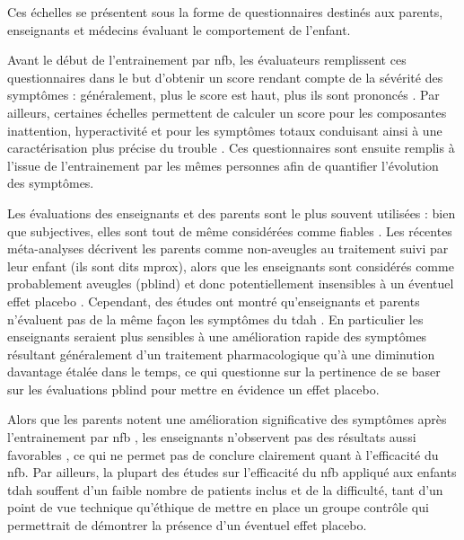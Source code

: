 Ces échelles se présentent sous la forme de questionnaires destinés aux parents, enseignants et médecins évaluant le comportement de l'enfant. 

Avant le début de l'entrainement par \gls{nfb}, les évaluateurs remplissent ces questionnaires dans le but d'obtenir un score rendant compte de 
la sévérité des symptômes : généralement, plus le score est haut, plus ils sont prononcés \citep{Pappas2006, Conners2008}. Par ailleurs, certaines échelles 
permettent de calculer un score pour les composantes inattention, hyperactivité et pour les symptômes totaux conduisant ainsi à une caractérisation 
plus précise du trouble \citep{Pappas2006}. Ces questionnaires sont ensuite remplis à l'issue de l'entrainement par les mêmes personnes afin de quantifier l'évolution 
des symptômes. 

Les évaluations des enseignants et des parents sont le plus souvent utilisées : bien que subjectives, elles sont tout de même considérées comme fiables 
\citep{Mcgough2004, Arns2020}. Les récentes méta-analyses décrivent les parents comme non-aveugles au traitement suivi par leur enfant (ils sont dits \gls{mprox}), alors
que les enseignants sont considérés comme probablement aveugles (\gls{pblind}) et donc potentiellement insensibles à un éventuel effet placebo 
\citep{Micoulaud2014, Cortese2016}. Cependant, des études ont montré qu'enseignants et parents n'évaluent pas de la même façon les symptômes du \gls{tdah}
\citep{Sollie2013, Narad2015, Minder2018, Enriquez2019, Arns2020}. En particulier les enseignants seraient plus sensibles à une amélioration
rapide des symptômes résultant généralement d'un traitement pharmacologique qu'à une diminution davantage étalée dans le temps, 
ce qui questionne sur la pertinence de se baser sur les évaluations \gls{pblind} pour mettre en évidence un 
effet placebo.

Alors que les parents notent une amélioration significative des symptômes après l'entrainement par \gls{nfb} \citep{Arns2020}, les enseignants n'observent pas des
résultats aussi favorables \citep{Arns2009, Sonuga-Barke2013, Cortese2016}, ce qui ne permet pas de conclure clairement quant à l'efficacité du \gls{nfb}.
Par ailleurs, la plupart des études sur l'efficacité du \gls{nfb} appliqué aux enfants \gls{tdah} souffent d'un faible nombre de patients inclus 
\citep{Baumeister2016, Heinrich2004} et de la difficulté, tant d'un point de vue technique qu'éthique \citep{LaVaque2001, Birbaumer1991, Holtmann2014} de mettre en place 
un groupe contrôle qui permettrait de démontrer la présence d'un éventuel effet placebo.

